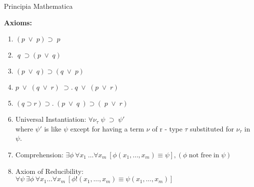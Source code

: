 \calculusAcronym{}         





\maketitle


\begin{entry}{Principia Mathematica}  




\begin{calculus}

\textbf{Axioms:}
\begin{enumerate}
\item $ ( p\; {\scriptstyle \vee} \;  p )  \supset  \;  p $ 

\item $\; q \;  \supset (  p \;  {\scriptstyle \vee} \; q ) $ 

\item $( p \;  {\scriptstyle \vee} \; q  ) \supset ( q \;  {\scriptstyle \vee} \; p )  $ 

 
\item  $  p \;  {\scriptstyle \vee} \; (q \;  {\scriptstyle \vee} \;r ) \;  \supset . \; q \;  {\scriptstyle \vee} \; (p \;  {\scriptstyle \vee} \;r  )   $

\item  $ ( q \supset r    )  \supset . \; (p \;  {\scriptstyle \vee} \; q \; ) \supset (\; p \;  {\scriptstyle \vee} \; r ) $ 


\item Universal Instantiation: 
$ \forall \nu_{\tau} \; \psi \; \supset \;  \psi '$ \\ where $\psi '$ is like $\psi$ except for having a term $\nu$ of r - type $\tau$ substituted for $\nu_{\tau}$ in $\psi$.


\item Comprehension: $\exists \phi \: \forall x_1 \: \ldots \forall x_m \: [ \phi (x_1, \ldots , x_m) \equiv \psi], (\phi \mathrm{\; not \; free \; in\; } \psi)$


\item Axiom of Reducibility: \\ $ \forall \psi \: \exists \phi \: \forall x_1 \ldots \forall x_m \: [ \phi ! (x_1, \ldots , x_m) \equiv \psi  (x_1, \ldots , x_m)]$




\end{enumerate}
\end{calculus}
\end{entry}
